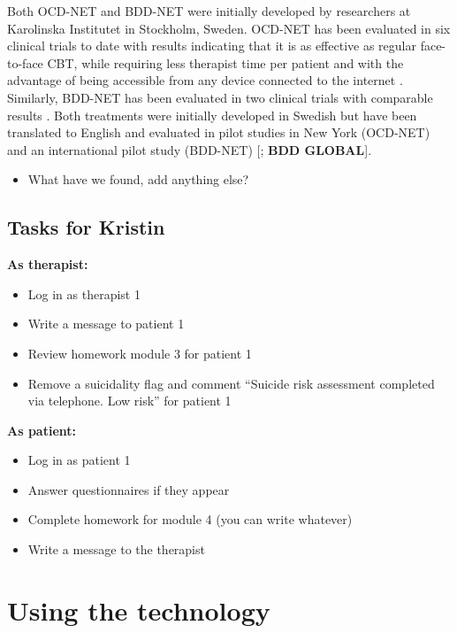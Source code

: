 \documentclass[]{book}
\providecommand{\tightlist}{%
  \setlength{\itemsep}{0pt}\setlength{\parskip}{0pt}}
\theoremstyle{definition}
\theoremstyle{definition}
\theoremstyle{definition}
\theoremstyle{remark}
\begin{document}
Both OCD-NET and BDD-NET were initially developed by researchers at
Karolinska Institutet in Stockholm, Sweden. OCD-NET has been evaluated
in six clinical trials to date with results indicating that it is as
effective as regular face-to-face CBT, while requiring less therapist
time per patient and with the advantage of being accessible from any
device connected to the internet
\citep{andersson2011a, andersson2012, andersson2014a, andersson2015a, ruck2018}.
Similarly, BDD-NET has been evaluated in two clinical trials with
comparable results \citep{enander2014, enander2016}. Both treatments
were initially developed in Swedish but have been translated to English
and evaluated in pilot studies in New York (OCD-NET) and an
international pilot study (BDD-NET) {[}\citet{patel2017}; \textbf{BDD
GLOBAL}{]}.

\begin{itemize}
\tightlist
\item
  What have we found, add anything else?
\end{itemize}

\hypertarget{tasks-for-kristin}{%
\section{Tasks for Kristin}\label{tasks-for-kristin}}

\textbf{As therapist:}

\begin{itemize}
\tightlist
\item
  Log in as therapist 1
\item
  Write a message to patient 1
\item
  Review homework module 3 for patient 1
\item
  Remove a suicidality flag and comment ``Suicide risk assessment
  completed via telephone. Low risk'' for patient 1
\end{itemize}

\textbf{As patient:}

\begin{itemize}
\tightlist
\item
  Log in as patient 1
\item
  Answer questionnaires if they appear
\item
  Complete homework for module 4 (you can write whatever)
\item
  Write a message to the therapist
\end{itemize}

\hypertarget{using-the-technology}{%
\chapter{Using the technology}\label{using-the-technology}}
\end{document}
